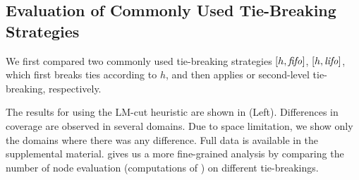 \subsection{Evaluation of  Commonly Used Tie-Breaking Strategies}

We first compared two commonly used tie-breaking strategies $[h,\mbox{\textit{fifo}}]$, $[h,\mbox{\textit{lifo}}]$, which
first breaks ties according to $h$, and then applies \fifo or \lifo
second-level tie-breaking, respectively.

The results for \astar using the LM-cut heuristic \cite{Helmert2009} are
shown in  (Left).
Differences in coverage are observed in several domains.
Due to space limitation, we show only the domains
where there was any difference. Full data is available in the
supplemental material. 
% 
 gives us a
more fine-grained analysis by comparing the number of node evaluation
(computations of \lmcut) on different tie-breakings.


\begin{table}[tb]
 \centering {}
 
 
 \caption{Experiments with 5 min, 2GB setting,
 comparing the coverages of \fifo and \lifo
 second-level tie-breaking, with (left) and without (right) the
 conventional first-level $h$ tie-breaking.  For the space reason, we
 omitted those domains whose results are the same. (Full results are
 available in the supplemental material.)
 }
 \label{single-coverage}
\end{table}


